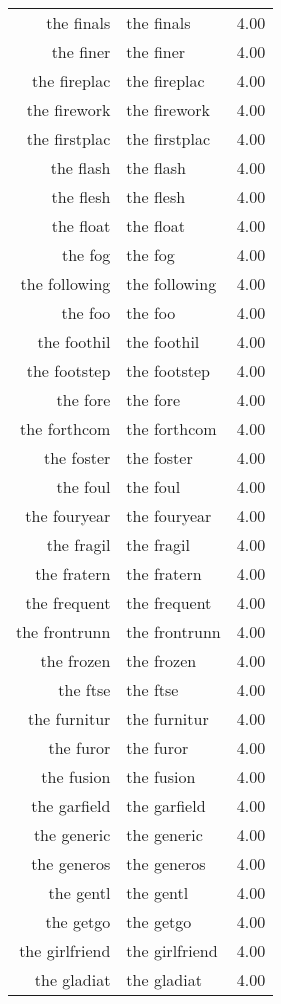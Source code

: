 \begin{table}[ht]
\begin{tabular}{rlr}
  the finals & the finals & 4.00 \\ 
  the finer & the finer & 4.00 \\ 
  the fireplac & the fireplac & 4.00 \\ 
  the firework & the firework & 4.00 \\ 
  the firstplac & the firstplac & 4.00 \\ 
  the flash & the flash & 4.00 \\ 
  the flesh & the flesh & 4.00 \\ 
  the float & the float & 4.00 \\ 
  the fog & the fog & 4.00 \\ 
  the following & the following & 4.00 \\ 
  the foo & the foo & 4.00 \\ 
  the foothil & the foothil & 4.00 \\ 
  the footstep & the footstep & 4.00 \\ 
  the fore & the fore & 4.00 \\ 
  the forthcom & the forthcom & 4.00 \\ 
  the foster & the foster & 4.00 \\ 
  the foul & the foul & 4.00 \\ 
  the fouryear & the fouryear & 4.00 \\ 
  the fragil & the fragil & 4.00 \\ 
  the fratern & the fratern & 4.00 \\ 
  the frequent & the frequent & 4.00 \\ 
  the frontrunn & the frontrunn & 4.00 \\ 
  the frozen & the frozen & 4.00 \\ 
  the ftse & the ftse & 4.00 \\ 
  the furnitur & the furnitur & 4.00 \\ 
  the furor & the furor & 4.00 \\ 
  the fusion & the fusion & 4.00 \\ 
  the garfield & the garfield & 4.00 \\ 
  the generic & the generic & 4.00 \\ 
  the generos & the generos & 4.00 \\ 
  the gentl & the gentl & 4.00 \\ 
  the getgo & the getgo & 4.00 \\ 
  the girlfriend & the girlfriend & 4.00 \\ 
  the gladiat & the gladiat & 4.00 \\ 

\end{tabular}
\end{table}
